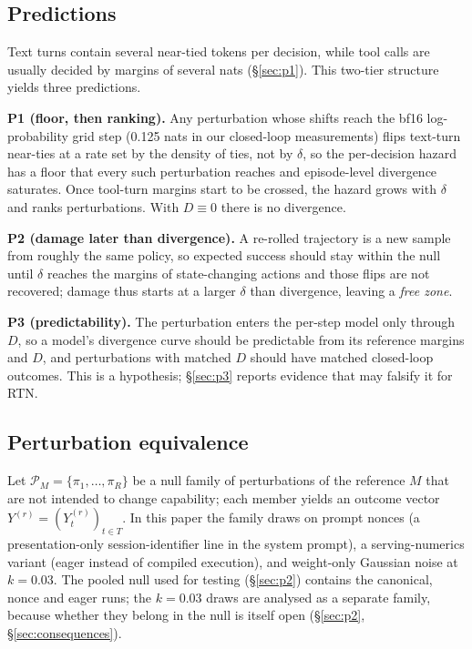 \subsection{Predictions}
Text turns contain several near-tied tokens per decision, while tool calls are usually decided by margins of several nats (\S\ref{sec:p1}). This two-tier structure yields three predictions.

\textbf{P1 (floor, then ranking).} Any perturbation whose shifts reach the bf16 log-probability grid step (0.125 nats in our closed-loop measurements) flips text-turn near-ties at a rate set by the density of ties, not by $\delta$, so the per-decision hazard has a floor that every such perturbation reaches and episode-level divergence saturates. Once tool-turn margins start to be crossed, the hazard grows with $\delta$ and ranks perturbations. With $D \equiv 0$ there is no divergence.

\textbf{P2 (damage later than divergence).} A re-rolled trajectory is a new sample from roughly the same policy, so expected success should stay within the null until $\delta$ reaches the margins of state-changing actions and those flips are not recovered; damage thus starts at a larger $\delta$ than divergence, leaving a \emph{free zone}.

\textbf{P3 (predictability).} The perturbation enters the per-step model only through $D$, so a model's divergence curve should be predictable from its reference margins and $D$, and perturbations with matched $D$ should have matched closed-loop outcomes. This is a hypothesis; \S\ref{sec:p3} reports evidence that may falsify it for RTN.

\subsection{Perturbation equivalence}
\label{sec:criterion}
Let $\mathcal{P}_M = \{\pi_1, \ldots, \pi_R\}$ be a null family of perturbations of the reference $M$ that are not intended to change capability; each member yields an outcome vector $Y^{(r)} = (Y_t^{(r)})_{t \in T}$. In this paper the family draws on prompt nonces (a presentation-only session-identifier line in the system prompt), a serving-numerics variant (eager instead of compiled execution), and weight-only Gaussian noise at $k = 0.03$. The pooled null used for testing (\S\ref{sec:p2}) contains the canonical, nonce and eager runs; the $k = 0.03$ draws are analysed as a separate family, because whether they belong in the null is itself open (\S\ref{sec:p2}, \S\ref{sec:consequences}).

